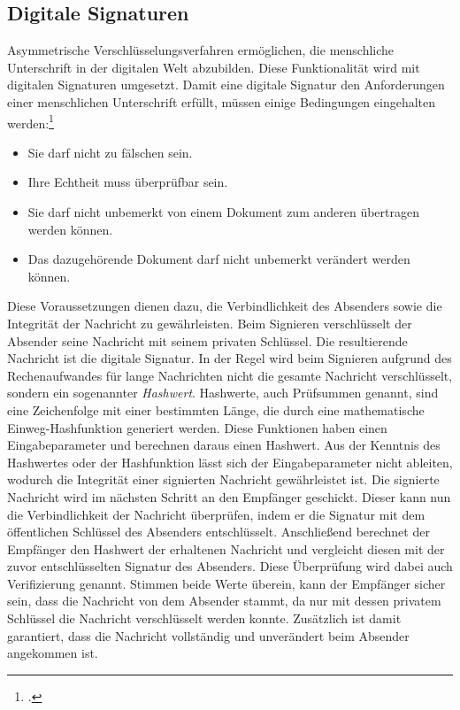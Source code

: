 \documentclass  [paper=a4,
				fontsize=12pt,
				listof=totoc,
				bibliography=totoc
				]{scrreprt}
\begin{document}
			\subsection{Digitale Signaturen}\label{chap: Signatur}	
				Asymmetrische Verschlüsselungsverfahren ermöglichen, die menschliche Unterschrift in der digitalen Welt abzubilden. Diese Funktionalität wird mit digitalen Signaturen umgesetzt. Damit eine digitale Signatur den Anforderungen einer menschlichen Unterschrift erfüllt, müssen einige Bedingungen eingehalten werden:\footcite[Vgl.][S. 202]{Schmeh2013}
				\begin{itemize}
					\item Sie darf nicht zu fälschen sein.
					\item Ihre Echtheit muss überprüfbar sein.
					\item Sie darf nicht unbemerkt von einem Dokument zum anderen übertragen werden können.
					\item Das dazugehörende Dokument darf nicht unbemerkt verändert werden können.
				\end{itemize}
				Diese Voraussetzungen dienen dazu, die Verbindlichkeit des Absenders sowie die Integrität der Nachricht zu gewährleisten. Beim Signieren verschlüsselt der Absender seine Nachricht mit seinem privaten Schlüssel. Die resultierende Nachricht ist die digitale Signatur. In der Regel wird	beim Signieren aufgrund des Rechenaufwandes für lange Nachrichten nicht die gesamte Nachricht verschlüsselt, sondern ein sogenannter \textit{Hashwert}. Hashwerte, auch Prüfsummen genannt, sind eine Zeichenfolge mit einer bestimmten Länge, die durch eine mathematische Einweg-Hashfunktion generiert werden. Diese Funktionen haben einen Eingabeparameter und berechnen daraus einen Hashwert. Aus der Kenntnis des Hashwertes oder der Hashfunktion lässt sich der Eingabeparameter nicht ableiten, wodurch die Integrität einer signierten Nachricht gewährleistet ist.
				Die signierte Nachricht wird im nächsten Schritt an den Empfänger geschickt. Dieser kann nun die Verbindlichkeit der Nachricht überprüfen, indem er die Signatur mit dem öffentlichen Schlüssel des Absenders entschlüsselt. Anschließend berechnet der Empfänger den Hashwert der erhaltenen Nachricht und vergleicht diesen mit der zuvor entschlüsselten Signatur des Absenders. Diese Überprüfung wird dabei auch Verifizierung genannt. Stimmen beide Werte überein, kann der Empfänger sicher sein, dass die Nachricht von dem Absender stammt, da nur mit dessen privatem Schlüssel die Nachricht verschlüsselt werden konnte. Zusätzlich ist damit garantiert, dass die Nachricht vollständig und unverändert beim Absender angekommen ist.
				
\end{document}
